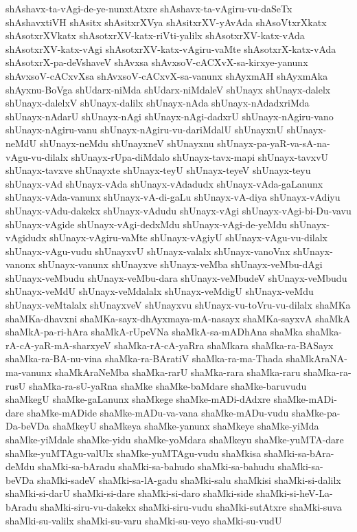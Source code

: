{shAshavx-ta-vAgi-de-ye-nunxtAtxre
shAshavx-ta-vAgiru-vu-daSeTx
shAshavxtiVH
shAsitx
shAsitxrXVya
shAsitxrXV-yAvAda
shAsoVtxrXkatx
shAsotxrXVkatx
shAsotxrXV-katx-riVti-yalilx
shAsotxrXV-katx-vAda
shAsotxrXV-katx-vAgi
shAsotxrXV-katx-vAgiru-vaMte
shAsotxrX-katx-vAda
shAsotxrX-pa-deVshaveV
shAvxsa
shAvxsoV-cACXvX-sa-kirxye-yanunx
shAvxsoV-cACxvXsa
shAvxsoV-cACxvX-sa-vanunx
shAyxmAH
shAyxmAka
shAyxnu-BoVga
shUdarx-niMda
shUdarx-niMdaleV
shUnayx
shUnayx-dalelx
shUnayx-dalelxV
shUnayx-dalilx
shUnayx-nAda
shUnayx-nAdadxriMda
shUnayx-nAdarU
shUnayx-nAgi
shUnayx-nAgi-dadxrU
shUnayx-nAgiru-vano
shUnayx-nAgiru-vanu
shUnayx-nAgiru-vu-dariMdalU
shUnayxnU
shUnayx-neMdU
shUnayx-neMdu
shUnayxneV
shUnayxnu
shUnayx-pa-yaR-va-sA-na-vAgu-vu-dilalx
shUnayx-rUpa-diMdalo
shUnayx-tavx-mapi
shUnayx-tavxvU
shUnayx-tavxve
shUnayxte
shUnayx-teyU
shUnayx-teyeV
shUnayx-teyu
shUnayx-vAd
shUnayx-vAda
shUnayx-vAdadudx
shUnayx-vAda-gaLanunx
shUnayx-vAda-vanunx
shUnayx-vA-di-gaLu
shUnayx-vA-diya
shUnayx-vAdiyu
shUnayx-vAdu-dakekx
shUnayx-vAdudu
shUnayx-vAgi
shUnayx-vAgi-bi-Du-vavu
shUnayx-vAgide
shUnayx-vAgi-dedxMdu
shUnayx-vAgi-de-yeMdu
shUnayx-vAgidudx
shUnayx-vAgiru-vaMte
shUnayx-vAgiyU
shUnayx-vAgu-vu-dilalx
shUnayx-vAgu-vudu
shUnayxvU
shUnayx-valalx
shUnayx-vanoVnx
shUnayx-vanonx
shUnayx-vanunx
shUnayxve
shUnayx-veMba
shUnayx-veMbu-dAgi
shUnayx-veMbudu
shUnayx-veMbu-dara
shUnayx-veMbudeV
shUnayx-veMbudu
shUnayx-veMdU
shUnayx-veMdalalx
shUnayx-veMdigU
shUnayx-veMdu
shUnayx-veMtalalx
shUnayxveV
shUnayxvu
shUnayx-vu-toVru-vu-dilalx
shaMKa
shaMKa-dhavxni
shaMKa-sayx-dhAyxmaya-mA-nasayx
shaMKa-sayxvA
shaMkA
shaMkA-pa-ri-hAra
shaMkA-rUpeVNa
shaMkA-sa-mADhAna
shaMka
shaMka-rA-cA-yaR-mA-sharxyeV
shaMka-rA-cA-yaRra
shaMkara
shaMka-ra-BASayx
shaMka-ra-BA-nu-vina
shaMka-ra-BAratiV
shaMka-ra-ma-Thada
shaMkAraNA-ma-vanunx
shaMkAraNeMba
shaMka-rarU
shaMka-rara
shaMka-raru
shaMka-ra-rusU
shaMka-ra-sU-yaRna
shaMke
shaMke-baMdare
shaMke-baruvudu
shaMkegU
shaMke-gaLanunx
shaMkege
shaMke-mADi-dAdxre
shaMke-mADi-dare
shaMke-mADide
shaMke-mADu-va-vana
shaMke-mADu-vudu
shaMke-pa-Da-beVDa
shaMkeyU
shaMkeya
shaMke-yanunx
shaMkeye
shaMke-yiMda
shaMke-yiMdale
shaMke-yidu
shaMke-yoMdara
shaMkeyu
shaMke-yuMTA-dare
shaMke-yuMTAgu-valUlx
shaMke-yuMTAgu-vudu
shaMkisa
shaMki-sa-bAra-deMdu
shaMki-sa-bAradu
shaMki-sa-bahudo
shaMki-sa-bahudu
shaMki-sa-beVDa
shaMki-sadeV
shaMki-sa-lA-gadu
shaMki-salu
shaMkisi
shaMki-si-dalilx
shaMki-si-darU
shaMki-si-dare
shaMki-si-daro
shaMki-side
shaMki-si-heV-La-bAradu
shaMki-siru-vu-dakekx
shaMki-siru-vudu
shaMki-sutAtxre
shaMki-suva
shaMki-su-valilx
shaMki-su-varu
shaMki-su-veyo
shaMki-su-vudU
}
